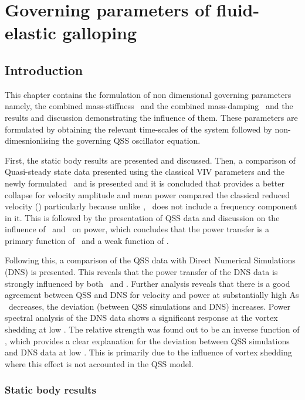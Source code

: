 \chapter{Governing parameters of  fluid-elastic galloping}
\label{chap:goven_para}

\section{Introduction}

This chapter contains the formulation of non dimensional governing parameters namely, the combined mass-stiffness \massstiff \ and the combined mass-damping \massdamp \ and the results and discussion demonstrating the influence of them. These parameters are formulated by obtaining the relevant time-scales of the system followed by non-dimesnionlising the governing QSS oscillator equation.  

First, the static body results are presented and discussed. Then, a comparison of Quasi-steady state data presented using the classical VIV parameters and the newly formulated \massstiff \ and \massdamp is presented and it is concluded that \massdamp provides a better collapse for velocity amplitude and mean power compared the classical reduced velocity (\ustar) particularly because unlike \ustar, \massdamp \ does not include a frequency component in it. This is followed by the presentation of QSS data and discussion on the influence of \massstiff \ and \massdamp \ on power, which concludes that the power transfer is a primary function of \massdamp \ and a weak function of \massstiff.

Following this, a comparison of the QSS data with Direct Numerical Simulations (DNS) is presented. This reveals that the power transfer of the DNS data is strongly influenced by both \massstiff \ and \massdamp. Further analysis reveals that there is a good agreement between QSS and DNS for velocity and power at substantially high \massstiff\. As \massstiff \ decreases, the deviation (between QSS simulations and DNS) increases. Power spectral analysis of the DNS data shows a significant response at the vortex shedding at low \massstiff. The relative strength was found out to be an inverse function of \massstiff, which provides a clear explanation for the deviation between QSS simulations and DNS data at low \massstiff. This is primarily due to the influence of vortex shedding where this effect is not accounted in the QSS model.


\subsection{Static body results}



